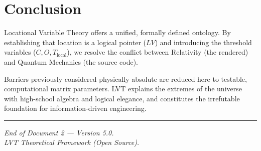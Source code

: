 \documentclass[12pt,a4paper]{article}
\begin{document}
\section{Conclusion}

Locational Variable Theory offers a unified, formally defined ontology. By establishing that location is a logical pointer ($LV$) and introducing the threshold variables ($C, O, T_{\mathrm{local}}$), we resolve the conflict between Relativity (the rendered) and Quantum Mechanics (the source code). 

Barriers previously considered physically absolute are reduced here to testable, computational matrix parameters. LVT explains the extremes of the universe with high-school algebra and logical elegance, and constitutes the irrefutable foundation for information-driven engineering.

\vspace{2em}
\hrule
\vspace{0.5em}
\begin{center}
\small\textit{End of Document 2 --- Version 5.0. \\
LVT Theoretical Framework (Open Source).}
\end{center}
\end{document}
